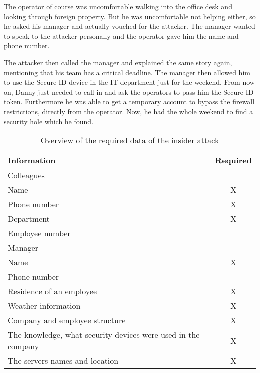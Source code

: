 The operator of course was uncomfortable walking into the office desk and
looking through foreign property. But he was uncomfortable not helping either,
so he asked his manager and actually vouched for the attacker. The manager
wanted to speak to the attacker personally and the operator gave him the name
and phone number.

The attacker then called the manager and explained the same story again,
mentioning that his team has a critical deadline. The manager then allowed him
to use the Secure ID device in the IT department just for the weekend. From now
on, Danny just needed to call in and ask the operators to pass him the Secure
ID token. Furthermore he was able to get a temporary account to bypass the
firewall restrictions, directly from the operator. Now, he had the whole
weekend to find a security hole which he found.

\begin{table*}[ht]
  \centering
  \begin{tabular}{p{}c}
    \toprule
    Information & Required\\
    \midrule
    \multicolumn{2}{l}{Colleagues}\\
    \hspace{0.5cm} Name & X\\
    \hspace{0.5cm} Phone number & X\\
    \hspace{0.5cm} Department &  X\\
    \hspace{0.5cm} Employee number &  \\
    \multicolumn{2}{l}{Manager}\\
    \hspace{0.5cm} Name & X\\
    \hspace{0.5cm} Phone number & \\
    Residence of an employee & X\\
    Weather information & X\\
    Company and employee structure & X\\
    The knowledge, what security devices were used in the company & X\\
    The servers names and location & X\\
    \bottomrule
  \end{tabular}
  \caption{Overview of the required data of the insider attack}
\end{table*}

